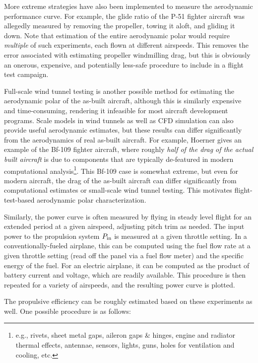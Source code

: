 \documentclass[conf]{new-aiaa}
\begin{document}
    More extreme strategies have also been implemented to measure the aerodynamic performance curve. For example, the glide ratio of the P-51 fighter aircraft was allegedly measured by removing the propeller, towing it aloft, and gliding it down. Note that estimation of the entire aerodynamic polar would require \textit{multiple} of such experiments, each flown at different airspeeds. This removes the error associated with estimating propeller windmilling drag, but this is obviously an onerous, expensive, and potentially less-safe procedure to include in a flight test campaign.

    Full-scale wind tunnel testing is another possible method for estimating the aerodynamic polar of the as-built aircraft, although this is similarly expensive and time-consuming, rendering it infeasible for most aircraft development programs. Scale models in wind tunnels as well as CFD simulation can also provide useful aerodynamic estimates, but these results can differ significantly from the aerodynamics of real as-built aircraft. For example, Hoerner \cite{hoerner_fluiddynamic_1965} gives an example of the Bf-109 fighter aircraft, where roughly \textit{half of the drag of the actual built aircraft} is due to components that are typically de-featured in modern computational analysis\footnote{e.g., rivets, sheet metal gaps, aileron gaps \& hinges, engine and radiator thermal effects, antennae, sensors, lights, guns, holes for ventilation and cooling, etc.}. This Bf-109 case is somewhat extreme, but even for modern aircraft, the drag of the as-built aircraft can differ significantly from computational estimates or small-scale wind tunnel testing. This motivates flight-test-based aerodynamic polar characterization.

    Similarly, the power curve is often measured by flying in steady level flight for an extended period at a given airspeed, adjusting pitch trim as needed. The input power to the propulsion system $P_{\rm in}$ is measured at a given throttle setting. In a conventionally-fueled airplane, this can be computed using the fuel flow rate at a given throttle setting (read off the panel via a fuel flow meter) and the specific energy of the fuel. For an electric airplane, it can be computed as the product of battery current and voltage, which are readily available. This procedure is then repeated for a variety of airspeeds, and the resulting power curve is plotted.

    The propulsive efficiency can be roughly estimated based on these experiments as well. One possible procedure is as follows:
\end{document}

